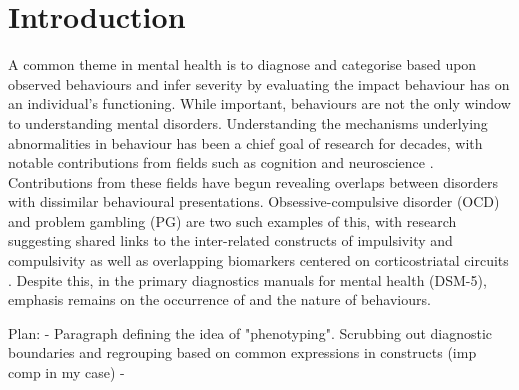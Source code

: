 \section{Introduction}

A common theme in mental health is to diagnose and categorise based upon observed behaviours and infer severity by evaluating the impact behaviour has on an individual's functioning. While important, behaviours are not the only window to understanding mental disorders. Understanding the mechanisms underlying abnormalities in behaviour has been a chief goal of research for decades, with notable contributions from fields such as cognition and neuroscience \cite{Frank_2015}. Contributions from these fields have begun revealing overlaps between disorders with dissimilar behavioural presentations. Obsessive-compulsive disorder (OCD) and problem gambling (PG) are two such examples of this, with research suggesting shared links to the inter-related constructs of impulsivity and compulsivity \cite{Tavares_2007} as well as overlapping biomarkers centered on corticostriatal circuits \cite{van_Holst_2010,Harrison_2009,Harrison_2013}. Despite this, in the primary diagnostics manuals for mental health (DSM-5), emphasis remains on the occurrence of and the nature of behaviours.

Plan:
- Paragraph defining the idea of "phenotyping". Scrubbing out diagnostic boundaries and regrouping based on common expressions in constructs (imp comp in my case)
- 




